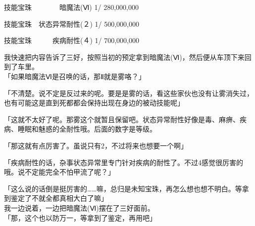   技能宝珠　　　　暗魔法(Ⅵ) 1/ 280,000,000

  技能宝珠　状态异常耐性(２) 1/ 500,000,000

  技能宝珠　　　疾病耐性(４) 1/ 700,000,000

\cardline

我快速把内容告诉了三好，按照当初的预定拿到暗魔法(Ⅵ)，然后便从车顶下来回到了车里。\\

「如果暗魔法Ⅵ是召唤的话，那Ⅱ就是雾咯？」

「不清楚。说不定是反过来的呢。要是是雾的话，看这些家伙也没有让雾消失过，也有可能这是直到死都都会保持出现在身边的被动技能呢」

「这就不太好了呢。那雾这个就暂且保留吧。状态异常耐性好像是毒、麻痹、疾病、睡眠和魅惑的全耐性哦。后面的数字是等级。

「那这就有点厉害了。虽说只有2，不过将来也想要一个啊」

「疾病耐性的话，杂事状态异常里专门针对疾病的耐性了。不过4感觉很厉害的哦。说不定能完全不怕甲流了呢？」

「这么说的话倒是挺厉害的……嘛，总归是未知宝珠，再怎么想也想不明白。等拿到鉴定了不就全都真相大白了嘛」\\

我一边说着，一边把暗魔法(Ⅵ)摆在了三好面前。\\

「那，这个也以防万一，等拿到了鉴定，再用吧」

